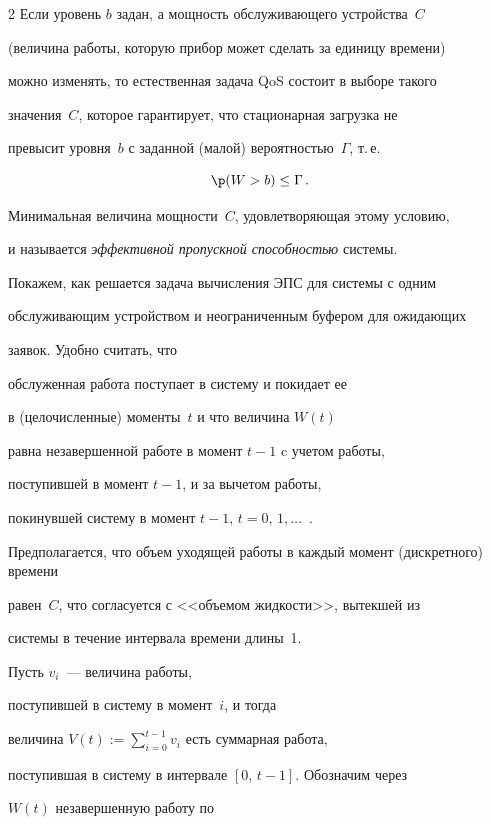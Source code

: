 \begin{multicols}{2}
Если уровень $b$ задан, а  мощность   обслуживающего устройства~$C$

(величина работы, которую прибор может сделать за единицу времени)

можно изменять, то естественная задача QoS состоит в   выборе такого

значения~$C$, которое гарантирует, что  стационарная загрузка не

превысит уровня~$b$ с заданной (малой) вероятностью~$\Gamma$, т.\,е.\

\begin{equation}

\p(W>b)\le \Gamma\,.\label{1-bor}

\end{equation}

Минимальная  величина мощности~$C$, удовлетворяющая этому  условию,

и называется  \textit{эффективной пропускной способностью} сис\-темы.



Покажем, как решается  задача вычисления  ЭПС для системы с одним

обслуживающим устройством и неограниченным  буфером  для ожидающих

заявок. Удобно считать, что

  обслуженная работа поступает в систему и покидает ее

 в  (целочисленные) моменты~$t$   и что   величина $W(t)$

 равна  незавершенной работе в момент $t-1$ c учетом работы,

 поступившей в момент $t-1$,  и за вычетом  работы,

 покинувшей систему в момент $t-1,\,t=0,\,1,\ldots$~\cite{Lewis}.



 Предполагается, что объем уходящей работы в каждый  момент (дискретного) времени

равен~$C$, что согласуется с <<объемом жидкости>>, вытекшей из

системы в течение  интервала времени длины~1.

 Пусть $v_i$~--- величина работы,

поступившей в сис\-те\-му в момент~$i$, и тогда

величина $V(t):=\sum\limits_{i=0}^{t-1} v_i$ есть суммарная работа,

поступившая в систему в интервале  $[0,\,t-1]$. Обозначим через

 $W(t)$  незавершенную работу по


\end{multicols}
